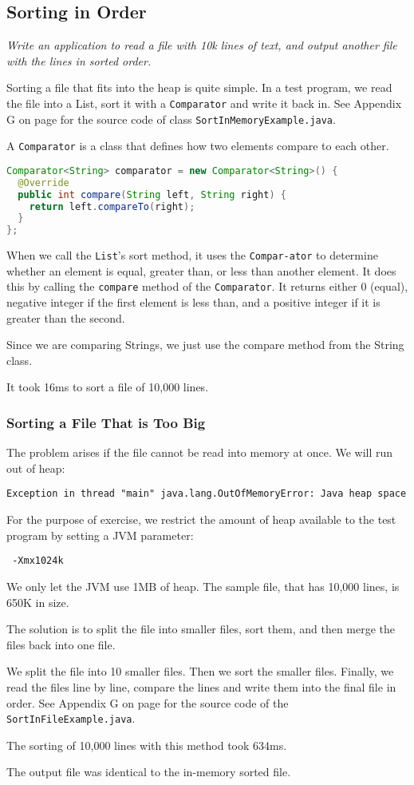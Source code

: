 \subsection{Sorting in Order}
\textit{Write an application to read a file with 10k lines of text, and output another file with the lines in sorted order.}

Sorting a file that fits into the heap is quite simple. In a test program, we read the file into a List, sort it with a \texttt{Comparator} and write it back in. See Appendix G on page \pageref{App:AppendixG} for the source code of class \texttt{SortInMemoryExample.java}.

A \texttt{Comparator} is a class that defines how two elements compare to each other.
\begin{lstlisting}[language=Java]
Comparator<String> comparator = new Comparator<String>() {
  @Override
  public int compare(String left, String right) {
    return left.compareTo(right);
  }
};
\end{lstlisting}

When we call the \texttt{List}'s sort method, it uses the \texttt{Compar\hyp{}ator} to determine whether an element is equal, greater than, or less than another element. It does this by calling the \texttt{compare} method of the \texttt{Comparator}. It returns either 0 (equal), negative integer if the first element is less than, and a positive integer if it is greater than the second.

Since we are comparing Strings, we just use the compare method from the String class.

It took 16ms to sort a file of 10,000 lines.

\subsubsection{Sorting a File That is Too Big}

The problem arises if the file cannot be read into memory at once. We will run out of heap:
\begin{lstlisting}
Exception in thread "main" java.lang.OutOfMemoryError: Java heap space
\end{lstlisting}

For the purpose of exercise, we restrict the amount of heap available to the test program by setting a JVM parameter:
\begin{lstlisting}
 -Xmx1024k
\end{lstlisting}
We only let the JVM use 1MB of heap. The sample file, that has 10,000 lines, is 650K in size. 

The solution is to split the file into smaller files, sort them, and then merge the files back into one file.

We split the file into 10 smaller files. Then we sort the smaller files. Finally, we read the files line by line, compare the lines and write them into the final file in order.  See Appendix G on page \pageref{App:AppendixG} for the source code of the \texttt{SortInFileExample.java}.

The sorting of 10,000 lines with this method took 634ms.

The output file was identical to the in-memory sorted file.